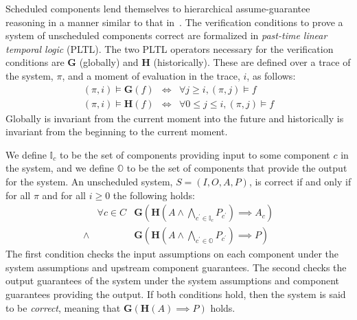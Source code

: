
\newcommand{\globally}{\ensuremath{\mathbf{G}}}
\newcommand{\historically}{\ensuremath{\mathbf{H}}}
\newcommand{\assumes}{\ensuremath{A}}
\newcommand{\guarantees}{\ensuremath{P}}
\newcommand{\dispatch}{\ensuremath{\mathit{dispatch}}}
\newcommand{\complete}{\ensuremath{\mathit{complete}}}
\newcommand{\same}[1]{\ensuremath{\mathit{same}(#1)}}
\newcommand{\inputs}{\ensuremath{I}}
\newcommand{\outputs}{\ensuremath{O}}
\newcommand{\system}{\ensuremath{S}}
\newcommand{\components}{\ensuremath{C}}
\newcommand{\schedule}{\ensuremath{\phi}}
\newcommand{\valid}{\ensuremath{\mathit{valid}}}
\newcommand{\dpred}{\ensuremath{\delta^\phi}}
\newcommand{\dispred}{\ensuremath{\mathbb{D}^\phi}}
\newcommand{\compred}{\ensuremath{\mathbb{C}^\phi}}

Scheduled components lend themselves to hierarchical assume-guarantee reasoning in a manner similar to that in~\cite{AGREE2}.
The verification conditions to prove a system of unscheduled components correct are formalized in \emph{past-time linear temporal logic} (PLTL). 
The two PLTL operators necessary for the verification conditions are $\globally$ (globally) and $\historically$ (historically).
These are defined over a trace of the system, $\pi$, and a moment of evaluation in the trace, $i$, as follows:
\begin{eqnarray*}
 (\pi, i) \models \globally(f) & \iff & \forall j \ge i, (\pi, j) \models f \\
(\pi, i) \models \historically(f) & \iff & \forall 0 \le j \le i, (\pi, j) \models f
\end{eqnarray*}
Globally is invariant from the current moment into the future and historically is invariant from the beginning to the current moment.

We define $\mathbb{I}_c$ to be the set of components providing input to some component $c$ in the system, and we define $\mathbb{O}$ to be the set of components that provide the output for the system. An unscheduled system, $\system = (\inputs, \outputs, \assumes, \guarantees)$, is correct if and only if for all $\pi$ and for all $i \ge 0$ the following holds:
\[
\begin{array}{lll}
        & \forall c \in \components &  
            \globally(\historically(\assumes \wedge 
            \bigwedge_{c^\prime \in \mathbb{I}_c} P_{c^\prime}) 
            \implies \assumes_c) \\
 \wedge &   & 
            \globally(\historically(\assumes \wedge 
            \bigwedge_{c^\prime \in \mathbb{O}} \guarantees_{c^\prime}) 
            \implies \guarantees)
\end{array}
\]
The first condition checks the input assumptions on each component under the system assumptions and upstream component guarantees. The second checks the output guarantees of the system under the system assumptions and component guarantees providing the output.  If both conditions hold, then the system is said to be \emph{correct}, meaning that $\globally(\historically(\assumes) \implies \guarantees)$ holds.

